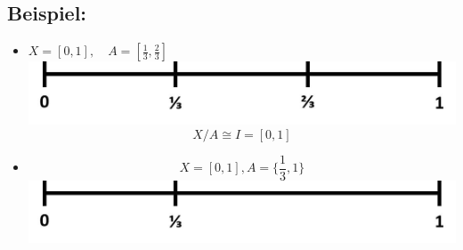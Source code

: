 \documentclass[a4paper,11pt,notitlepage]{report}
\theoremstyle{remark}
\theoremstyle{definition}
\newenvironment{bsp}[1]
{
\setlength{\fboxsep}{10pt}
\subsection*{Beispiel: #1}
\begin{upshape}
}
{
\end{upshape}
}
\begin{document}
\begin{bsp}{}
	\begin{itemize}
		\item $X = [0,1], \quad A = [\frac{1}{3}, \frac{2}{3}]$ \includegraphics[scale=0.4]{images/0_1_drittel.jpg}
	$$X/A \cong I = [0,1]$$
		\item $$ X = [0,1], A = \{\frac{1}{3}, 1\}$$ \includegraphics[scale=0.4]{images/0_1_drittel_2.jpg}

\end{itemize}
\end{bsp}
\end{document}

